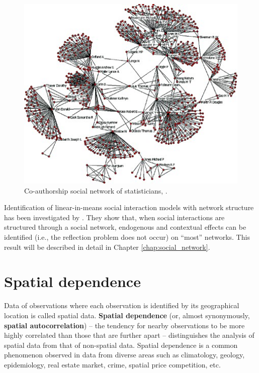 \documentclass[10.5pt, A4paper, openany, uplatex]{book}
\numberwithin{equation}{section}
\begin{document}
\begin{figure}[h!]
	\begin{center}
		\includegraphics[width = 13cm]{coauthor.jpg}
		\caption{Co-authorship social network of statisticians, \cite{said2010author}.}
		\label{fig:coauthor}
	\end{center}
\end{figure}

Identification of linear-in-means social interaction models with network structure has been investigated by \cite{bramoulle2009identification}.
They show that, when social interactions are structured through a social network, endogenous and contextual effects can be identified (i.e., the reflection problem does not occur) on ``most'' networks.
This result will be described in detail in Chapter \ref{chap:social_network}.

\section{Spatial dependence}

Data of observations where each observation is identified by its geographical location is called spatial data. \textbf{Spatial dependence} (or, almost synonymously, \textbf{spatial autocorrelation}) -- the tendency for nearby observations to be more highly correlated than those that are further apart -- distinguishes the analysis of spatial data from that of non-spatial data.
Spatial dependence is a common phenomenon observed in data from diverse areas such as climatology, geology, epidemiology, real estate market, crime, spatial price competition, etc. 
\end{document}
